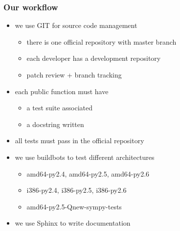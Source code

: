 \documentclass[handout]{beamer}
\begin{document}
\begin{frame}[fragile]
    \frametitle{Our workflow}

    \begin{itemize}
        \item we use GIT for source code management
            \begin{itemize}
                \item there is one official repository with master branch
                \item each developer has a development repository
                \item patch review + branch tracking
            \end{itemize}
        \item each public function must have
        \begin{itemize}
            \item a test suite associated
            \item a docstring written 
        \end{itemize}
        \item all tests must pass in the official repository
        \item we use buildbots to test different architectures
        \begin{itemize}
            \item amd64-py2.4, amd64-py2.5, amd64-py2.6
            \item i386-py2.4, i386-py2.5, i386-py2.6
            \item amd64-py2.5-Qnew-sympy-tests
        \end{itemize}
        \item we use Sphinx to write documentation
    \end{itemize}
\end{frame}
\end{document}
